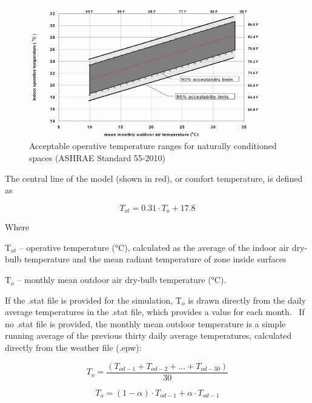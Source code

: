 \begin{figure}[hbtp] %
\centering
\includegraphics[width=0.9\textwidth, height=0.9\textheight, keepaspectratio=true]{media/image6814.png}
\caption{Acceptable operative temperature ranges for naturally conditioned spaces (ASHRAE Standard 55-2010) \protect \label{fig:acceptable-operative-temperature-ranges-for}}
\end{figure}

The central line of the model (shown in red), or comfort temperature, is defined as

\begin{equation}
{T_{ot}} = 0.31\cdot {T_o} + 17.8
\end{equation}

Where

T\(_{ot}\) -- operative temperature (°C), calculated as the average of the indoor air dry-bulb temperature and the mean radiant temperature of zone inside surfaces

T\(_{o}\) -- monthly mean outdoor air dry-bulb temperature (°C).

If the .stat file is provided for the simulation, T\(_{o}\) is drawn directly from the daily average temperatures in the .stat file, which provides a value for each month.~ If no .stat file is provided, the monthly mean outdoor temperature is a simple running average of the previous thirty daily average temperatures, calculated directly from the weather file (.epw):

\begin{equation}
{T_o} = \frac{{\left( {{T_{od - 1}} + {T_{od - 2}} + ... + {T_{od - 30}}} \right)}}{{30}}
\end{equation}

\begin{equation}
{T_o} = (1 - \alpha )\cdot {T_{od - 1}} + \alpha \cdot {T_{od - 1}}
\end{equation}


